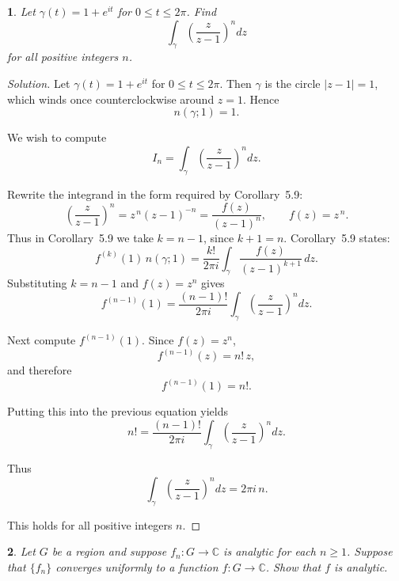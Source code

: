 \documentclass[12pt, a4paper]{report}
\theoremstyle{spaced}
\newtheorem{exercise}{}
\newcommand{\setexercise}[1]{\setcounter{exercise}{#1-1}}
\begin{document}
\setexercise{7}
\begin{exercise}
	Let $\gamma(t) = 1 + e^{it}$ for $0 \le t \le 2\pi$.
	Find
	\[
		\int_{\gamma} \left(\frac{z}{z-1}\right)^{n} dz
	\]
	for all positive integers $n$.
\end{exercise}

\begin{proof}[Solution]
	Let $\gamma(t)=1+e^{it}$ for $0\le t\le 2\pi$.
	Then $\gamma$ is the circle $|z-1|=1$, which winds once counterclockwise around $z=1$.
	Hence
	\[
		n(\gamma;1)=1.
	\]

	We wish to compute
	\[
		I_n=\int_{\gamma}\left(\frac{z}{z-1}\right)^{n} dz.
	\]

	Rewrite the integrand in the form required by Corollary~5.9:
	\[
		\left(\frac{z}{z-1}\right)^n
		= z^{\,n}(z-1)^{-n}
		= \frac{f(z)}{(z-1)^{n}},
		\qquad f(z)=z^{\,n}.
	\]
	Thus in Corollary~5.9 we take $k=n-1$, since $k+1=n$.
	Corollary~5.9 states:
	\[
		f^{(k)}(1)\, n(\gamma;1)
		= \frac{k!}{2\pi i}
		\int_{\gamma} \frac{f(z)}{(z-1)^{k+1}}\, dz.
	\]
	Substituting $k=n-1$ and $f(z)=z^n$ gives
	\[
		f^{(n-1)}(1)
		= \frac{(n-1)!}{2\pi i}
		\int_{\gamma} \left(\frac{z}{z-1}\right)^{n} dz.
	\]

	Next compute $f^{(n-1)}(1)$.
	Since $f(z)=z^{n}$,
	\[
		f^{(n-1)}(z)=n!
		\, z,
	\]
	and therefore
	\[
		f^{(n-1)}(1)=n!.
	\]

	Putting this into the previous equation yields
	\[
		n!
		= \frac{(n-1)!}{2\pi i}
		\int_{\gamma} \left(\frac{z}{z-1}\right)^n dz.
	\]

	Thus
	\[
		\int_{\gamma}\left(\frac{z}{z-1}\right)^n dz
		= 2\pi i\, n.
	\]

	This holds for all positive integers $n$.
\end{proof}


\setexercise{8}
\begin{exercise}
	Let $G$ be a region and suppose $f_n : G \to \mathbb{C}$ is analytic for each $n \ge 1$.
	Suppose that $\{f_n\}$ converges uniformly to a function $f : G \to \mathbb{C}$.
	Show that $f$ is analytic.
\end{exercise}
\end{document}
